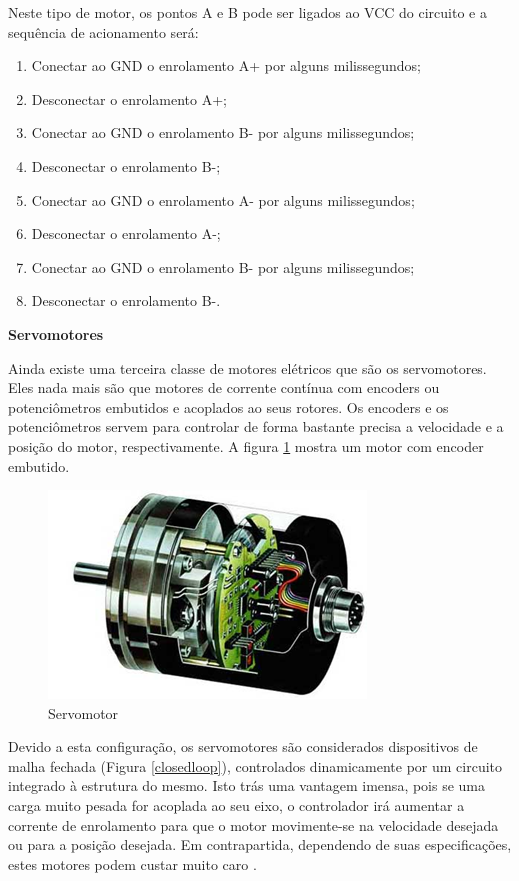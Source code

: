 \begin{anexosenv}
Neste tipo de motor, os pontos A e B pode ser ligados ao VCC do circuito e a sequência de acionamento será:
\begin{enumerate}
\item Conectar ao GND o enrolamento A+ por alguns milissegundos;
\item Desconectar o enrolamento A+;
\item Conectar ao GND o enrolamento B- por alguns milissegundos;
\item Desconectar o enrolamento B-;
\item Conectar ao GND o enrolamento A- por alguns milissegundos;
\item Desconectar o enrolamento A-;
\item Conectar ao GND o enrolamento B- por alguns milissegundos;
\item Desconectar o enrolamento B-.
\end{enumerate}




\textbf{Servomotores}

Ainda existe uma terceira classe de motores elétricos que são os servomotores. Eles nada mais são que motores de corrente contínua com encoders ou potenciômetros embutidos e acoplados ao seus rotores. Os encoders e os potenciômetros servem para controlar de forma bastante precisa a velocidade e a posição do motor, respectivamente. A figura \ref{fig24} mostra um motor com encoder embutido.

\begin{figure}[htb]
		\centering
			\includegraphics[scale=0.9]{figuras/motores6.png}
		\caption{Servomotor}
		\label{fig24}
\end{figure}

Devido a esta configuração, os servomotores são considerados dispositivos de malha fechada (Figura \ref{closedloop}), controlados dinamicamente por um circuito integrado à estrutura do mesmo. Isto trás uma vantagem imensa, pois se uma carga muito pesada for acoplada ao seu eixo, o controlador irá aumentar a corrente de enrolamento para que o motor movimente-se na velocidade desejada ou para a posição desejada. Em contrapartida, dependendo de suas especificações, estes motores podem custar muito caro \cite{nippon}.


\end{anexosenv}
